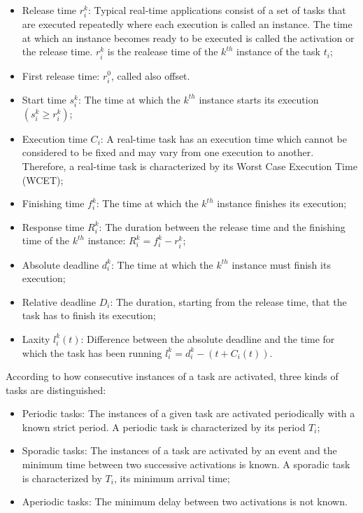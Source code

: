 \begin{itemize}
\item Release time $r^k_i$: Typical real-time applications consist of a set of tasks that are executed repeatedly where each execution is called an instance. The time at which an instance becomes ready to be executed is called the activation or the release time. $r^k_i$ is the realease time of the $k^{th}$ instance of the task $t_i$;
\item First release time: $r^0_i$, called also offset.
\item Start time $s^k_i$: The time at which the $k^{th}$ instance starts its execution $(s^k_i \geq r^k_i)$;
\item Execution time $C_i$: A real-time task has an execution time which cannot be considered to be fixed and may vary from one execution to another. Therefore, a real-time task is characterized by its Worst Case Execution Time (WCET);
\item Finishing time $f^k_i$: The time at which the $k^{th}$ instance finishes its execution;
\item Response time $R^k_i$: The duration between the release time and the finishing time of the $k^{th}$ instance: $R^k_i = f^k_i - r^k_i$;
\item Absolute deadline $d^k_i$: The time at which the $k^{th}$ instance must finish its execution;
\item Relative deadline $D_i$: The duration, starting from the release time, that the task has to finish its execution;
\item Laxity $l^k_i(t)$: Difference between the absolute deadline and the time for which the task has been running $l^k_i=d^k_i-(t+C_i(t))$.
\end{itemize}

\noindent According to how consecutive instances of a task are activated, three kinds of tasks are distinguished:
\begin{itemize}
\item Periodic tasks: The instances of a given task are activated periodically with a known strict period. A periodic task is characterized by its period $T_i$;
\item Sporadic tasks: The instances of a task are activated by an event and the minimum time between two successive activations is known. A sporadic task is characterized by $T_i$, its minimum arrival time;
\item Aperiodic tasks: The minimum delay between two activations is not known.
\end{itemize} 

